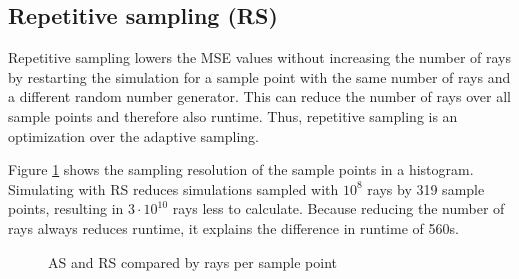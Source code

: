 \subsection{Repetitive sampling (RS)}
Repetitive sampling lowers the MSE values without increasing the number of rays by restarting the
simulation for a sample point with the same number of rays and a different random number 
generator. This can reduce the number of rays over all sample points and therefore
also runtime. Thus, repetitive sampling is an optimization over the adaptive sampling. 

Figure \ref{plot:repetitive} shows the sampling resolution
of the sample points in a histogram. Simulating with RS reduces
simulations sampled with $10^8$ rays by 319 sample points, resulting in 
$3\cdot10^{10}$ rays less to calculate. Because reducing the number of rays always
reduces runtime, it explains the difference in runtime
of 560s.
\begin{figure}[H]
  \centerline{
    }
  \caption{AS and RS compared by rays per sample point}
  \label{plot:repetitive}
\end{figure}

